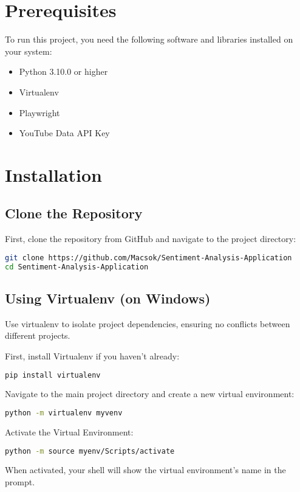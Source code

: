 \documentclass[a4paper]{article}
\begin{document}
\section{Prerequisites}
To run this project, you need the following software and libraries installed on your system:
\begin{itemize}
    \item Python 3.10.0 or higher
    \item Virtualenv
    \item Playwright
    \item YouTube Data API Key
\end{itemize}

\section{Installation}
\subsection{Clone the Repository}
First, clone the repository from GitHub and navigate to the project directory:
\begin{lstlisting}[language=bash]
git clone https://github.com/Macsok/Sentiment-Analysis-Application
cd Sentiment-Analysis-Application
\end{lstlisting}

\subsection{Using Virtualenv (on Windows)}
Use virtualenv to isolate project dependencies, ensuring no conflicts between different projects.

First, install Virtualenv if you haven't already:
\begin{lstlisting}[language=bash]
pip install virtualenv
\end{lstlisting}

Navigate to the main project directory and create a new virtual environment:
\begin{lstlisting}[language=bash]
python -m virtualenv myvenv
\end{lstlisting}

Activate the Virtual Environment:
\begin{lstlisting}[language=bash]
python -m source myenv/Scripts/activate
\end{lstlisting}

When activated, your shell will show the virtual environment’s name in the prompt.
\end{document}
